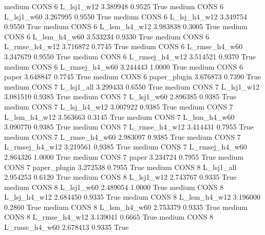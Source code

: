     medium     CONS                 6     L_lsj1_w12   3.389948      0.9525    True
    medium     CONS                 6     L_lsj1_w60   3.267995      0.9550    True
    medium     CONS                 6   L_lsj_h4_w12   3.349754      0.9550    True
    medium     CONS                 6   L_lsm_h4_w12   3.983838      0.3005    True
    medium     CONS                 6   L_lsm_h4_w60   3.533234      0.9330    True
    medium     CONS                 6  L_rmse_h4_w12   3.716872      0.7745    True
    medium     CONS                 6  L_rmse_h4_w60   3.347679      0.9550    True
    medium     CONS                 6 L_rmsej_h4_w12   3.514521      0.9370    True
    medium     CONS                 6 L_rmsej_h4_w60   3.244443      1.0000    True
    medium     CONS                 6          paper   3.648847      0.7745    True
    medium     CONS                 6   paper_plugin   3.676873      0.7390    True
    medium     CONS                 7     L_lsj1_all   3.299433      0.6550    True
    medium     CONS                 7     L_lsj1_w12   3.081510      0.9385    True
    medium     CONS                 7     L_lsj1_w60   2.896385      0.9385    True
    medium     CONS                 7   L_lsj_h4_w12   3.007922      0.9385    True
    medium     CONS                 7   L_lsm_h4_w12   3.563663      0.3145    True
    medium     CONS                 7   L_lsm_h4_w60   3.090770      0.9385    True
    medium     CONS                 7  L_rmse_h4_w12   3.414431      0.7955    True
    medium     CONS                 7  L_rmse_h4_w60   2.983097      0.9385    True
    medium     CONS                 7 L_rmsej_h4_w12   3.219561      0.9385    True
    medium     CONS                 7 L_rmsej_h4_w60   2.864326      1.0000    True
    medium     CONS                 7          paper   3.234724      0.7955    True
    medium     CONS                 7   paper_plugin   3.272538      0.7955    True
    medium     CONS                 8     L_lsj1_all   2.954253      0.6120    True
    medium     CONS                 8     L_lsj1_w12   2.743767      0.9335    True
    medium     CONS                 8     L_lsj1_w60   2.489054      1.0000    True
    medium     CONS                 8   L_lsj_h4_w12   2.684450      0.9335    True
    medium     CONS                 8   L_lsm_h4_w12   3.196000      0.2860    True
    medium     CONS                 8   L_lsm_h4_w60   2.753379      0.9335    True
    medium     CONS                 8  L_rmse_h4_w12   3.139041      0.6665    True
    medium     CONS                 8  L_rmse_h4_w60   2.678413      0.9335    True

